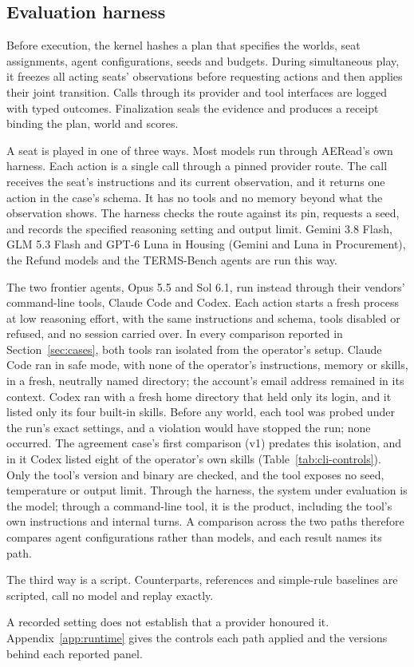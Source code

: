 \subsection{Evaluation harness}
Before execution, the kernel hashes a plan that specifies the worlds, seat
assignments, agent configurations, seeds and budgets. During simultaneous
play, it freezes all acting seats' observations before requesting actions
and then applies their joint transition. Calls through its provider and
tool interfaces are logged with typed outcomes. Finalization seals the
evidence and produces a receipt binding the plan, world and scores.

A seat is played in one of three ways. Most models run through AERead's
own harness. Each action is a single call through a pinned provider route.
The call receives the seat's instructions and its current observation, and it
returns one action in the case's schema. It has no tools and no memory beyond
what the observation shows. The harness checks the route against its pin, requests a
seed, and records the specified reasoning setting and output limit.
Gemini 3.8 Flash, GLM 5.3 Flash and GPT-6 Luna in Housing (Gemini and Luna
in Procurement), the Refund models and the TERMS-Bench agents are run this
way.

The two frontier agents, Opus 5.5 and Sol 6.1, run instead through
their vendors' command-line tools, Claude Code and Codex. Each action starts a fresh process
at low reasoning effort, with the same instructions and schema, tools
disabled or refused, and no session carried over. In every comparison reported in
Section~\ref{sec:cases}, both tools ran isolated from the operator's setup.
Claude Code ran in safe mode, with none of the operator's instructions,
memory or skills, in a fresh, neutrally named directory; the account's email
address remained in its context. Codex ran with a fresh home directory that
held only its login, and it listed only its four built-in skills. Before any
world, each tool was probed under the run's exact settings, and a violation
would have stopped the run; none occurred. The agreement case's first
comparison (v1) predates this isolation, and in it Codex listed eight of the
operator's own skills (Table~\ref{tab:cli-controls}). Only the tool's version
and binary are checked, and the tool exposes no seed, temperature or output
limit. Through the harness, the system under evaluation is the model; through a
command-line tool, it is the product, including the tool's own instructions and
internal turns. A comparison across the two paths therefore compares agent
configurations rather than models, and each result names its path.

The third way is a script. Counterparts, references and simple-rule baselines
are scripted, call no model and replay exactly.

A recorded setting does not establish that a provider honoured it.
Appendix~\ref{app:runtime} gives the controls each path applied and the
versions behind each reported panel.
